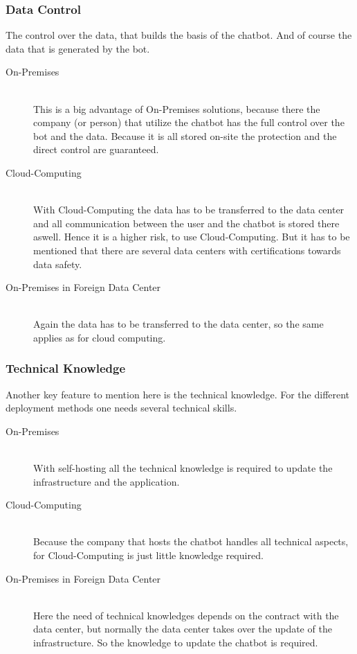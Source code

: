 \documentclass[10pt,final,journal,a4paper,oneside,twocolumn]{IEEEtran}
\begin{document}
\subsubsection{Data Control}
The control over the data, that builds the basis of the chatbot. And of course the data that is generated by the bot.
\begin{description}
\item[On-Premises]\hfill \\
This is a big advantage of On-Premises solutions, because there the company (or person) that utilize the chatbot has the full control over the bot and the data. Because it is all stored on-site the protection and the direct control are guaranteed. \cite{b29}
\item[Cloud-Computing]\hfill \\ 
With Cloud-Computing the data has to be transferred to the data center and all communication between the user and the chatbot is stored there aswell. Hence it is a higher risk, to use Cloud-Computing. But it has to be mentioned that there are several data centers with certifications towards data safety.
\item[On-Premises in Foreign Data Center]\hfill \\
Again the data has to be transferred to the data center, so the same applies as for cloud computing.
\end{description}

\subsubsection{Technical Knowledge}
Another key feature to mention here is the technical knowledge. For the different deployment methods one needs several technical skills.
\begin{description}
\item[On-Premises]\hfill \\
With self-hosting all the technical knowledge is required to update the infrastructure and the application. \cite{b29}
\item[Cloud-Computing]\hfill \\ 
Because the company that hosts the chatbot handles all technical aspects, for Cloud-Computing is just little knowledge required. \cite{b29}
\item[On-Premises in Foreign Data Center]\hfill \\
Here the need of technical knowledges depends on the contract with the data center, but normally the data center takes over the update of the infrastructure. So the knowledge to update the chatbot is required.
\end{description}
\end{document}
